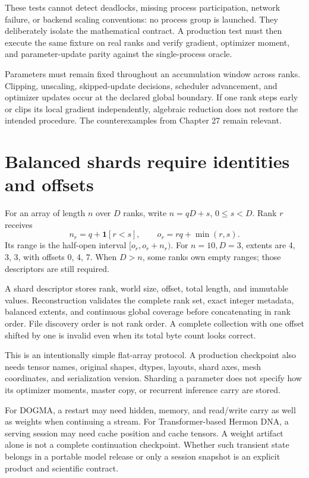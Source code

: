 These tests cannot detect deadlocks, missing process participation, network
failure, or backend scaling conventions: no process group is launched.
They deliberately isolate the mathematical contract. A production test must
then execute the same fixture on real ranks and verify gradient, optimizer
moment, and parameter-update parity against the single-process oracle.

Parameters must remain fixed throughout an accumulation window across ranks.
Clipping, unscaling, skipped-update decisions, scheduler advancement, and optimizer
updates occur at the declared global boundary. If one rank steps early or clips its
local gradient independently, algebraic reduction does not restore the intended
procedure. The counterexamples from Chapter 27 remain relevant.

\section{Balanced shards require identities and offsets}
For an array of length $n$ over $D$ ranks, write $n=qD+s$, $0\le s<D$.
Rank $r$ receives
\[
n_r=q+\mathbf1[r<s],\qquad
o_r=rq+\min(r,s).
\]
Its range is the half-open interval $[o_r,o_r+n_r)$.
For $n=10,D=3$, extents are 4, 3, 3, with offsets 0, 4, 7.
When $D>n$, some ranks own empty ranges; those descriptors are still required.

\begin{center}\end{center}
A shard descriptor stores rank, world size, offset, total length, and immutable
values. Reconstruction validates the complete rank set, exact integer metadata,
balanced extents, and continuous global coverage before concatenating in rank order.
File discovery order is not rank order. A complete collection with one offset
shifted by one is invalid even when its total byte count looks correct.

This is an intentionally simple flat-array protocol. A production checkpoint
also needs tensor names, original shapes, dtypes, layouts, shard axes, mesh
coordinates, and serialization version. Sharding a parameter does not specify
how its optimizer moments, master copy, or recurrent inference carry are stored.

For DOGMA, a restart may need hidden, memory, and read/write carry as well as weights
when continuing a stream. For Transformer-based Hermon DNA, a serving session may
need cache position and cache tensors. A weight artifact alone is not a complete
continuation checkpoint. Whether such transient state belongs in a portable model
release or only a session snapshot is an explicit product and scientific contract.

